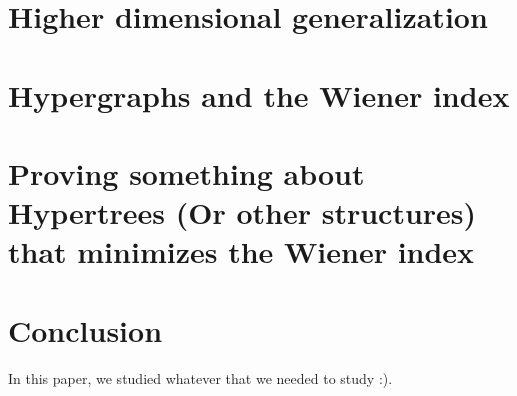 \documentclass{article}
\begin{document}
\section{Higher dimensional generalization}

\section{Hypergraphs and the Wiener index}

\section{Proving something about Hypertrees (Or other structures) that minimizes the Wiener index}

\section{Conclusion}
In this paper, we studied whatever that we needed to study :).




\end{document}
